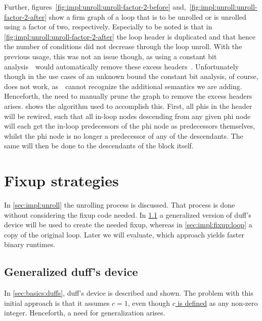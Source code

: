 Further, figures~\ref{fig:impl:unroll:unroll-factor-2-before} and,~\ref{fig:impl:unroll:unroll-factor-2-after} show a firm graph of a loop that is to be unrolled or is unrolled using a factor of two, respectively.
Especially to be noted is that in \cref{fig:impl:unroll:unroll-factor-2-after} the loop header is duplicated and that hence the number of conditions did not decrease through the loop unroll.
With the previous usage, this was not an issue though, as using a constant bit analysis~\libFIRM~would automatically remove these excess headers~\cite{aebi18bachelorarbeit}.
Unfortunately though in the use cases of an unknown bound the constant bit analysis, of course, does not work, as~\libFIRM~cannot recognize the additional semantics we are adding.
Henceforth, the need to manually prune the graph to remove the excess headers arises.
 shows the algorithm used to accomplish this.
First, all phis in the header will be rewired, such that all in-loop nodes descending from any given phi node will each get the in-loop predecessors of the phi node as predecessors themselves, whilst the phi node is no longer a predecessor of any of the descendants.
The same will then be done to the descendants of the block itself.

%

%

%

\section{Fixup strategies}\label{sec:impl:fixup}

In \cref{sec:impl:unroll} the unrolling process is discussed.
That process is done without considering the fixup code needed.
In \cref{sec:impl:fixup:duff} a generalized version of duff's device will be used to create the needed fixup, whereas in \cref{sec:impl:fixup:loop} a copy of the original loop.
Later we will evaluate, which approach yields faster binary runtimes.

\subsection{Generalized duff's device}\label{sec:impl:fixup:duff}

In \cref{sec:basics:duffs}, duff's device is described and shown.
The problem with this initial approach is that it assumes $c = 1$, even though \hyperref[sec:impl::def-c]{$c$ is defined} as any non-zero integer.
Henceforth, a need for generalization arises.

